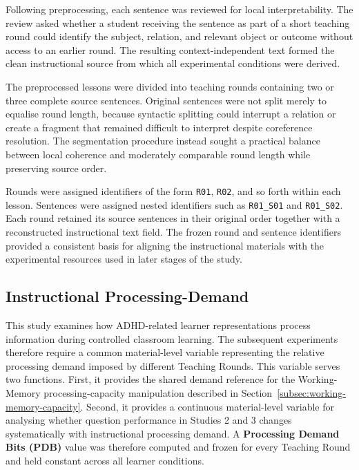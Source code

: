 Following preprocessing, each sentence was reviewed for local interpretability. The review asked whether a student receiving the sentence as part of a short teaching round could identify the subject, relation, and relevant object or outcome without access to an earlier round. The resulting context-independent text formed the clean instructional source from which all experimental conditions were derived.

The preprocessed lessons were divided into teaching rounds containing two or three complete source sentences. Original sentences were not split merely to equalise round length, because syntactic splitting could interrupt a relation or create a fragment that remained difficult to interpret despite coreference resolution. The segmentation procedure instead sought a practical balance between local coherence and moderately comparable round length while preserving source order.

Rounds were assigned identifiers of the form \texttt{R01}, \texttt{R02}, and so forth within each lesson. Sentences were assigned nested identifiers such as \texttt{R01\_S01} and \texttt{R01\_S02}. Each round retained its source sentences in their original order together with a reconstructed instructional text field. The frozen round and sentence identifiers provided a consistent basis for aligning the instructional materials with the experimental resources used in later stages of the study.

\subsection{Instructional Processing-Demand}
\label{subsec:instructional-processing-demand}

This study examines how ADHD-related learner representations process information during controlled classroom learning. The subsequent experiments therefore require a common material-level variable representing the relative processing demand imposed by different Teaching Rounds. This variable serves two functions. First, it provides the shared demand reference for the Working-Memory processing-capacity manipulation described in Section~\ref{subsec:working-memory-capacity}. Second, it provides a continuous material-level variable for analysing whether question performance in Studies 2 and 3 changes systematically with instructional processing demand. A \textbf{Processing Demand Bits (PDB)} value was therefore computed and frozen for every Teaching Round and held constant across all learner conditions.

